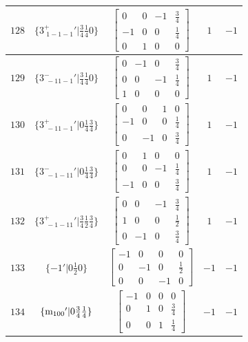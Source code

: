 \documentclass[fleqn,8pt]{jsarticle}
\begin{document}
\begin{longtable}{ccccc}
$ 128 $ & $ \{3^{+}_{\,\,1-1-1}{}'|\frac{3}{4} \frac{1}{4} 0\} $ & $ \begin{bmatrix} 0 & 0 & -1 & \frac{3}{4} \\ -1 & 0 & 0 & \frac{1}{4} \\ 0 & 1 & 0 & 0 \end{bmatrix} $ & $ 1 $ & $ -1 $ \\ \hline
$ 129 $ & $ \{3^{-}_{\,\,-11-1}{}'|\frac{3}{4} \frac{1}{4} 0\} $ & $ \begin{bmatrix} 0 & -1 & 0 & \frac{3}{4} \\ 0 & 0 & -1 & \frac{1}{4} \\ 1 & 0 & 0 & 0 \end{bmatrix} $ & $ 1 $ & $ -1 $ \\ \hline
$ 130 $ & $ \{3^{+}_{\,\,-11-1}{}'|0 \frac{1}{4} \frac{3}{4}\} $ & $ \begin{bmatrix} 0 & 0 & 1 & 0 \\ -1 & 0 & 0 & \frac{1}{4} \\ 0 & -1 & 0 & \frac{3}{4} \end{bmatrix} $ & $ 1 $ & $ -1 $ \\ \hline
$ 131 $ & $ \{3^{-}_{\,\,-1-11}{}'|0 \frac{1}{4} \frac{3}{4}\} $ & $ \begin{bmatrix} 0 & 1 & 0 & 0 \\ 0 & 0 & -1 & \frac{1}{4} \\ -1 & 0 & 0 & \frac{3}{4} \end{bmatrix} $ & $ 1 $ & $ -1 $ \\ \hline
$ 132 $ & $ \{3^{+}_{\,\,-1-11}{}'|\frac{3}{4} \frac{1}{2} \frac{3}{4}\} $ & $ \begin{bmatrix} 0 & 0 & -1 & \frac{3}{4} \\ 1 & 0 & 0 & \frac{1}{2} \\ 0 & -1 & 0 & \frac{3}{4} \end{bmatrix} $ & $ 1 $ & $ -1 $ \\ \hline
$ 133 $ & $ \{-1{}'|0 \frac{1}{2} 0\} $ & $ \begin{bmatrix} -1 & 0 & 0 & 0 \\ 0 & -1 & 0 & \frac{1}{2} \\ 0 & 0 & -1 & 0 \end{bmatrix} $ & $ -1 $ & $ -1 $ \\ \hline
$ 134 $ & $ \{{\rm m}_{100}{}'|0 \frac{3}{4} \frac{1}{4}\} $ & $ \begin{bmatrix} -1 & 0 & 0 & 0 \\ 0 & 1 & 0 & \frac{3}{4} \\ 0 & 0 & 1 & \frac{1}{4} \end{bmatrix} $ & $ -1 $ & $ -1 $ \\ \hline

\end{longtable}
\end{document}
